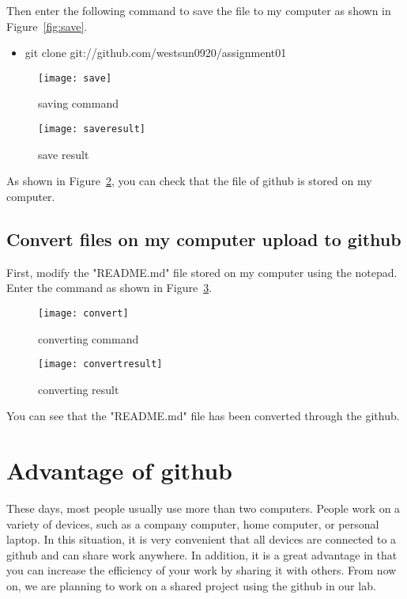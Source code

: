 \documentclass{article}
\begin{document}
Then enter the following command to save the file to my computer as shown in Figure~\ref{fig:save}.

\begin{itemize}
	\item git clone git://github.com/westsun0920/assignment01
\end{itemize}

\begin{figure}[h]
	\centering
	\texttt{[image: save]}
	\caption{saving command}
	\label{fig:command}
\end{figure}


\begin{figure}[h]
	\centering
	\texttt{[image: saveresult]}
	\caption{save result}
	\label{fig:save result}
\end{figure}

As shown in Figure~\ref{fig:save result}, you can check that the file of github is stored on my computer.


\subsection{Convert files on my computer upload to github}
First, modify the "README.md" file stored on my computer using the notepad.
Enter the command as shown in Figure~\ref{fig:convert}.

\newpage

\begin{figure}[h]
	\centering
	\texttt{[image: convert]}
	\caption{converting command}
	\label{fig:convert}
\end{figure}

\begin{figure}[h]
	\centering
	\texttt{[image: convertresult]}
	\caption{converting result}
	\label{fig:convert result}
\end{figure}

You can see that the "README.md" file has been converted through the github.

\newpage
\section{Advantage of github}
These days, most people usually use more than two computers.
People work on a variety of devices, such as a company computer, home computer, or personal laptop.
In this situation, it is very convenient that all devices are connected to a github and can share work anywhere.
In addition, it is a great advantage in that you can increase the efficiency of your work by sharing it with others.
From now on, we are planning to work on a shared project using the github in our lab.


\end{document}
